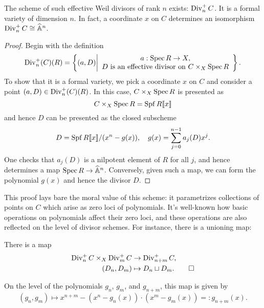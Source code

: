 \begin{lemma}
The scheme of such effective Weil divisors of rank $n$ exists: $\operatorname{Div}_n^+ C$.  It is a formal variety of dimension $n$.  In fact, a coordinate $x$ on $C$ determines an isomorphism $\operatorname{Div}_n^+ C \cong \widehat{\mathbb{A}}^n$.
\end{lemma}
\begin{proof}
Begin with the definition \[\operatorname{Div}_n^+(C)(R) = \left\{(a, D) \middle| \begin{array}{c} a: \operatorname{Spec} R \to X, \\ \text{$D$ is an effective divisor on $C \times_X \operatorname{Spec} R$} \end{array} \right\}.\]  To show that it is a formal variety, we pick a coordinate $x$ on $C$ and consider a point $(a, D) \in \operatorname{Div}_n^+(C)(R)$.  In this case, $C \times_X \operatorname{Spec} R$ is presented as \[C \times_X \operatorname{Spec} R = \operatorname{Spf} R\llbracket x \rrbracket\] and hence $D$ can be presented as the closed subscheme \[D = \operatorname{Spf} R\llbracket x \rrbracket / (x^n - g(x)), \quad g(x) = \sum_{j=0}^{n-1} a_j(D) x^j.\]  One checks that $a_j(D)$ is a nilpotent element of $R$ for all $j$, and hence determines a map $\operatorname{Spec} R \to \widehat{\mathbb{A}}^n$.  Conversely, given such a map, we can form the polynomial $g(x)$ and hence the divisor $D$.
\end{proof}

This proof lays bare the moral value of this scheme: it parametrizes collections of points on $C$ which arise as zero loci of polynomials.  It's well-known how basic operations on polynomials affect their zero loci, and these operations are also reflected on the level of divisor schemes.  For instance, there is a unioning map:
\begin{lemma}
There is a map
\begin{align*}
\operatorname{Div}_n^+ C \times_X \operatorname{Div}_m^+ C & \to \operatorname{Div}_{n+m}^+ C, \\
(D_n, D_m) & \mapsto D_n \sqcup D_m. \qed
\end{align*}
\end{lemma}
\begin{remark}\label{DescriptionOfSqCupMapOnPolynomials}
On the level of the polynomials $g_n$, $g_m$, and $g_{n+m}$, this map is given by \[(g_n, g_m) \mapsto x^{n+m} - (x^n - g_n(x)) \cdot (x^m - g_m(x)) =: g_{n+m}(x).\]
\end{remark}

